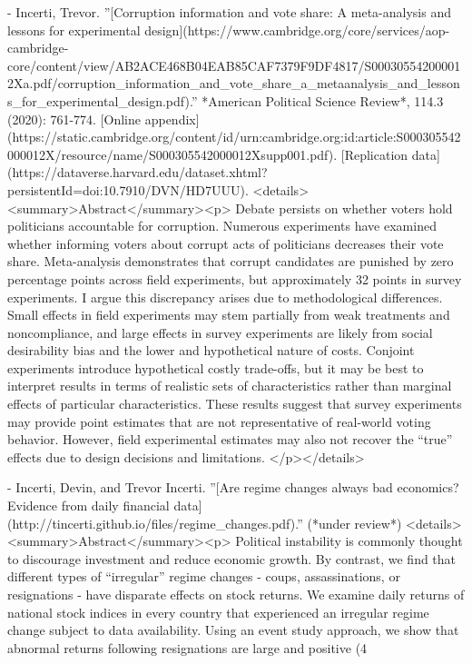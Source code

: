 - Incerti, Trevor. ''[Corruption information and vote share: A meta-analysis and lessons for experimental design](https://www.cambridge.org/core/services/aop-cambridge-core/content/view/AB2ACE468B04EAB85CAF7379F9DF4817/S000305542000012Xa.pdf/corruption_information_and_vote_share_a_metaanalysis_and_lessons_for_experimental_design.pdf).'' *American Political Science Review*, 114.3 (2020): 761-774. [Online appendix](https://static.cambridge.org/content/id/urn:cambridge.org:id:article:S000305542000012X/resource/name/S000305542000012Xsupp001.pdf). [Replication data](https://dataverse.harvard.edu/dataset.xhtml?persistentId=doi:10.7910/DVN/HD7UUU).  
  <details><summary>Abstract</summary><p> Debate persists on whether voters hold politicians accountable for corruption. Numerous experiments have examined whether informing voters about corrupt acts of politicians decreases their vote share. Meta-analysis demonstrates that corrupt candidates are punished by zero percentage points across field experiments, but approximately 32 points in survey experiments. I argue this discrepancy arises due to methodological differences. Small effects in field experiments may stem partially from weak treatments and noncompliance, and large effects in survey experiments are likely from social desirability bias and the lower and hypothetical nature of costs. Conjoint experiments introduce hypothetical costly trade-offs, but it may be best to interpret results in terms of realistic sets of characteristics rather than marginal effects of particular characteristics. These results suggest that survey experiments may provide point estimates that are not representative of real-world voting behavior. However, field experimental estimates may also not recover the “true” effects due to design decisions and limitations. </p></details>

- Incerti, Devin, and Trevor Incerti. ''[Are regime changes always bad economics? Evidence from daily financial data](http://tincerti.github.io/files/regime_changes.pdf).'' (*under review*)
  <details><summary>Abstract</summary><p> Political instability is commonly thought to discourage investment and reduce economic growth. By contrast, we find that different types of “irregular” regime changes - coups, assassinations, or resignations - have disparate effects on stock returns. We examine daily returns of national stock indices in every country that experienced an irregular regime change subject to data availability. Using an event study approach, we show that abnormal returns following resignations are large and positive (4%
   
